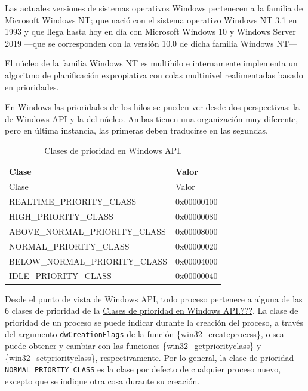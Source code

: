 Las actuales versiones de sistemas operativos Windows pertenecen a la
familia de Microsoft Windows NT; que nació con el sistema operativo
Windows NT 3.1 en 1993 y que llega hasta hoy en día con Microsoft
Windows 10 y Windows Server 2019 ---que se corresponden con la versión
10.0 de dicha familia Windows NT---

El núcleo de la familia Windows NT es multihilo e internamente
implementa un algoritmo de planificación expropiativa con colas
multinivel realimentadas basado en prioridades.

En Windows las prioridades de los hilos se pueden ver desde dos
perspectivas: la de Windows API y la del núcleo. Ambas tienen una
organización muy diferente, pero en última instancia, las primeras deben
traducirse en las segundas.

\begin{longtable}[]{@{}
  >{\raggedright\arraybackslash}p{}
  >{\raggedright\arraybackslash}p{}@{}}
\caption{Clases de prioridad en Windows
API.}\label{tabla-win32-clases-prioridad}\tabularnewline
\toprule\noalign{}
\begin{minipage}[b]{\linewidth}\centering
Clase
\end{minipage} & \begin{minipage}[b]{\linewidth}\centering
Valor
\end{minipage} \\
\midrule\noalign{}
\endfirsthead
\toprule\noalign{}
\begin{minipage}[b]{\linewidth}\centering
Clase
\end{minipage} & \begin{minipage}[b]{\linewidth}\centering
Valor
\end{minipage} \\
\midrule\noalign{}
\endhead
\bottomrule\noalign{}
\endlastfoot
REALTIME\_PRIORITY\_CLASS & 0x00000100 \\
HIGH\_PRIORITY\_CLASS & 0x00000080 \\
ABOVE\_NORMAL\_PRIORITY\_CLASS & 0x00008000 \\
NORMAL\_PRIORITY\_CLASS & 0x00000020 \\
BELOW\_NORMAL\_PRIORITY\_CLASS & 0x00004000 \\
IDLE\_PRIORITY\_CLASS & 0x00000040 \\
\end{longtable}

Desde el punto de vista de Windows API, todo proceso pertenece a alguna
de las 6 clases de prioridad de la
\hyperref[tabla-win32-clases-prioridad]{Clases de prioridad en Windows
API.}\hyperref[Win32-SchedulingPriorities]{???}. La clase de prioridad
de un proceso se puede indicar durante la creación del proceso, a través
del argumento \texttt{dwCreationFlags} de la función
\{win32\_createprocess\}, o sea puede obtener y cambiar con las
funciones \{win32\_getpriorityclass\} y \{win32\_setpriorityclass\},
respectivamente. Por lo general, la clase de prioridad
\texttt{NORMAL\_PRIORITY\_CLASS} es la clase por defecto de cualquier
proceso nuevo, excepto que se indique otra cosa durante su creación.

